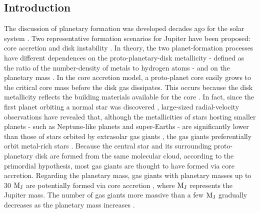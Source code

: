 \documentclass[twocolumn]{aastex62}
\begin{document}
\begin{CJK*}{UTF8}{min}


\section{Introduction} \label{sec:introduction}

The discussion of planetary formation was developed decades ago for the solar system \citep{1985prpl.conf.1100H}. Two representative formation scenarios for Jupiter have been proposed: core accretion \citep{1974Icar...22..416P, 1980PThPh..64..544M, 1996Icar..124...62P} and disk instability \citep{1951PNAS...37....1K, 1997Sci...276.1836B, 2002Sci...298.1756M}. In theory, the two planet-formation processes have different dependences on the proto-planetary-disk metallicity - defined as the ratio of the number-density of metals to hydrogen atoms - and on the planetary mass \citep[e.g.,][]{2007ApJ...662.1282M}. In the core accretion model, a proto-planet core easily grows to the critical core mass before the disk gas dissipates. This occurs because the disk metallicity reflects the building materials available for the core \citep{2004ApJ...616..567I, 2012A&A...541A..97M}. In fact, since the first planet orbiting a normal star was discovered \citep{1995Natur.378..355M}, large-sized radial-velocity observations have revealed that, although the metallicities of stars hosting smaller planets - such as Neptune-like planets and super-Earths - are significantly lower than those of stars orbited by extrasolar gas giants \citep{2011arXiv1109.2497M, 2015AJ....149...14W}, the gas giants preferentially orbit metal-rich stars \citep[e.g.,][]{2003A&A...398..363S, 2005ApJ...622.1102F}. Because the central star and its surrounding proto-planetary disk are formed from the same molecular cloud, according to the primordial hypothesis, most gas giants are thought to have formed via core accretion. Regarding the planetary mass, gas giants with planetary masses up to 30 $\rm M_J$ are potentially formed via core accretion \citep[e.g.,][]{2007ApJ...667..557T, 2016ApJ...823...48T}, where $\rm M_J$ represents the Jupiter mass. The number of gas giants more massive than a few $\rm M_J$ gradually decreases as the planetary mass increases \citep[e.g.,][]{2009A&A...501.1161M}.


\end{CJK*}
\end{document}
